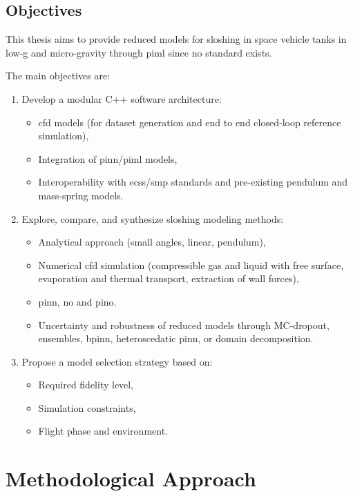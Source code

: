 \documentclass[12pt]{article}
\begin{document}
	\subsection*{Objectives}
	
	This thesis aims to provide reduced models for sloshing in space vehicle tanks in low-g and micro-gravity through \acrshort{piml} since no standard exists.
	
	The main objectives are:
	\begin{enumerate}
		\item Develop a modular C++ software architecture:
		\begin{itemize}
			\item \acrshort{cfd} models (for dataset generation and end to end closed-loop reference simulation),
			\item Integration of \gls{pinn}/\acrshort{piml} models,
			\item Interoperability with \acrshort{ecss}/\acrshort{smp} standards and pre-existing pendulum and mass-spring models.
		\end{itemize}
		\item Explore, compare, and synthesize sloshing modeling methods:
		\begin{itemize}
			\item Analytical approach (small angles, linear, pendulum),
			\item Numerical \acrshort{cfd} simulation (compressible gas and liquid with free surface, evaporation and thermal transport, extraction of wall forces),
			\item \acrfull{pinn}, \acrfull{no} and \acrfull{pino}.
			
			\item Uncertainty and robustness of reduced models through MC-dropout, ensembles,  \acrshort{bpinn}, heteroscedatic \acrshort{pinn}, or domain decomposition.
		\end{itemize}
		\item Propose a model selection strategy based on:
		\begin{itemize}
			\item Required fidelity level,
			\item Simulation constraints,
			\item Flight phase and environment.
		\end{itemize}
	\end{enumerate}
	
	\section*{Methodological Approach}
	
\end{document}

